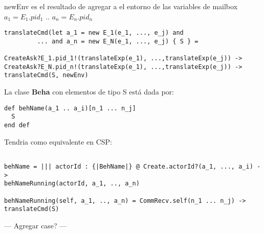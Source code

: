 \documentclass[fleqn]{article}
\begin{document}
newEnv es el resultado de agregar a el entorno de las variables de mailbox $a_1
= E_1.pid_1$ .. $a_n = E_n.pid_n$
\begin{verbatim}
translateCmd(let a_1 = new E_1(e_1, ..., e_j) and 
         ... and a_n = new E_N(e_1, ..., e_j) { S } = 

CreateAsk?E_1.pid_1!(translateExp(e_1), ...,translateExp(e_j)) ->
CreateAsk?E_N.pid_n!(translateExp(e_1), ...,translateExp(e_j)) ->
translateCmd(S, newEnv)
\end{verbatim}


La clase \textbf{Beha} con elementos de tipo S está dada por:

\begin{verbatim}
def behName(a_1 .. a_i)[n_1 ... n_j]
  S
end def
\end{verbatim}

Tendria como equivalente en CSP:

\begin{verbatim}

behName = ||| actorId : {|BehName|} @ Create.actorId?(a_1, ..., a_i) ->
behNameRunning(actorId, a_1, .., a_n)

behNameRunning(self, a_1, .., a_n) = CommRecv.self(n_1 ... n_j) -> translateCmd(S)

\end{verbatim}

--- Agregar case? ---


{}

\end{document}
